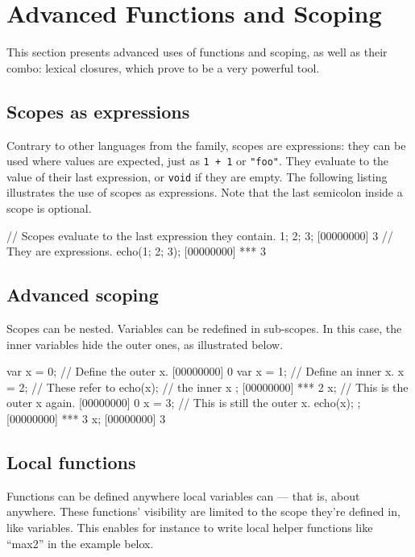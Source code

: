 \chapter{Advanced Functions and Scoping}
\label{sec:tut:function}

This section presents advanced uses of functions and scoping, as well
as their combo: lexical closures, which prove to be a very powerful
tool.

\section{Scopes as expressions}

Contrary to other languages from the \C family, scopes are
expressions: they can be used where values are expected, just as
\lstinline|1 + 1| or \lstinline|"foo"|.
They evaluate to the value of their last expression, or
\lstinline|void| if they are
empty. The following listing illustrates the use of scopes as
expressions. Note that the last semicolon inside a scope is optional.

\begin{urbiscript}[firstnumber=1]
// Scopes evaluate to the last expression they contain.
{ 1; 2; 3};
[00000000] 3
// They are expressions.
echo({1; 2; 3});
[00000000] *** 3
\end{urbiscript}

\section{Advanced scoping}

Scopes can be nested. Variables can be redefined in sub-scopes. In
this case, the inner variables hide the outer ones, as illustrated
below.

\begin{urbiscript}[firstnumber=last]
var x = 0;   // Define the outer x.
[00000000] 0
{
  var x = 1; // Define an inner x.
  x = 2;     // These refer to
  echo(x);   // the inner x
};
[00000000] *** 2
x;           // This is the outer x again.
[00000000] 0
{
  x = 3;     // This is still the outer x.
  echo(x);
};
[00000000] *** 3
x;
[00000000] 3
\end{urbiscript}

\section{Local functions}

Functions can be defined anywhere local variables can --- that is,
about anywhere. These functions' visibility are limited to the scope
they're defined in, like variables. This enables for instance to write
local helper functions like ``max2'' in the example belox.

